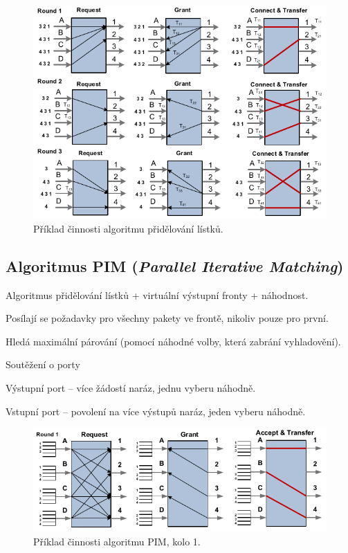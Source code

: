 \begin{figure}[H]
    \centering
    \includegraphics[width=1\linewidth]{algoritmus_pridelovani_listku_priklad.pdf}
    \caption{Příklad činnosti algoritmu přidělování lístků.}
\end{figure}

\subsection{Algoritmus PIM (\textit{Parallel Iterative Matching})}

\begin{compactitem}
    \item Algoritmus přidělování lístků + virtuální výstupní fronty + náhodnost. \begin{compactitem}
        \item Posílají se požadavky pro všechny pakety ve frontě, nikoliv pouze pro první.
    \end{compactitem}
    \item Hledá maximální párování (pomocí náhodné volby, která zabrání vyhladovění).
    \item Soutěžení o porty \begin{compactitem}
        \item Výstupní port -- více žádostí naráz, jednu vyberu náhodně.
        \item Vstupní port -- povolení na více výstupů naráz, jeden vyberu náhodně.
    \end{compactitem}
\end{compactitem}

\begin{figure}[H]
    \centering
    \includegraphics[width=1\linewidth]{algoritmus_pim_priklad_1.pdf}
    \caption{Příklad činnosti algoritmu PIM, kolo 1.}
\end{figure}

